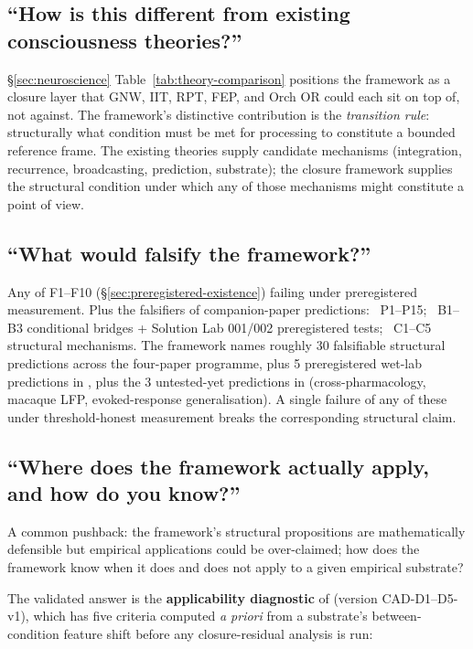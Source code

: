 \documentclass[11pt]{article}
\theoremstyle{plain}
\theoremstyle{definition}
\theoremstyle{remark}
\begin{document}
\subsection{``How is this different from existing consciousness theories?''}

\S\ref{sec:neuroscience} Table~\ref{tab:theory-comparison} positions the framework as a closure layer that GNW, IIT, RPT, FEP, and Orch OR could each sit on top of, not against. The framework's distinctive contribution is the \emph{transition rule}: structurally what condition must be met for processing to constitute a bounded reference frame. The existing theories supply candidate mechanisms (integration, recurrence, broadcasting, prediction, substrate); the closure framework supplies the structural condition under which any of those mechanisms might constitute a point of view.

\subsection{``What would falsify the framework?''}

Any of F1--F10 (\S\ref{sec:preregistered-existence}) failing under preregistered measurement. Plus the falsifiers of companion-paper predictions:~\citep{SmartLifeAsClosure} P1--P15;~\citep{SmartProcessingToPOV} B1--B3 conditional bridges + Solution Lab 001/002 preregistered tests;~\citep{SmartCosmicClosure} C1--C5 structural mechanisms. The framework names roughly 30 falsifiable structural predictions across the four-paper programme, plus 5 preregistered wet-lab predictions in \citet{SolutionLab001}, plus the 3 untested-yet predictions in \citet{SolutionLab002} (cross-pharmacology, macaque LFP, evoked-response generalisation). A single failure of any of these under threshold-honest measurement breaks the corresponding structural claim.

\subsection{``Where does the framework actually apply, and how do you know?''}

A common pushback: the framework's structural propositions are mathematically defensible but empirical applications could be over-claimed; how does the framework know when it does and does not apply to a given empirical substrate?

The validated answer is the \textbf{applicability diagnostic} of \citet{SmartClosureDistance} (version CAD-D1--D5-v1), which has five criteria computed \emph{a priori} from a substrate's between-condition feature shift before any closure-residual analysis is run:
\end{document}
